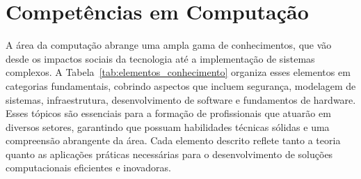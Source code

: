 \section{Competências em Computação}

A área da computação abrange uma ampla gama de conhecimentos, que vão desde os impactos sociais da tecnologia até a implementação de sistemas complexos. A Tabela~\ref{tab:elementos_conhecimento} organiza esses elementos em categorias fundamentais, cobrindo aspectos que incluem segurança, modelagem de sistemas, infraestrutura, desenvolvimento de software e fundamentos de hardware. Esses tópicos são essenciais para a formação de profissionais que atuarão em diversos setores, garantindo que possuam habilidades técnicas sólidas e uma compreensão abrangente da área. Cada elemento descrito reflete tanto a teoria quanto as aplicações práticas necessárias para o desenvolvimento de soluções computacionais eficientes e inovadoras.


